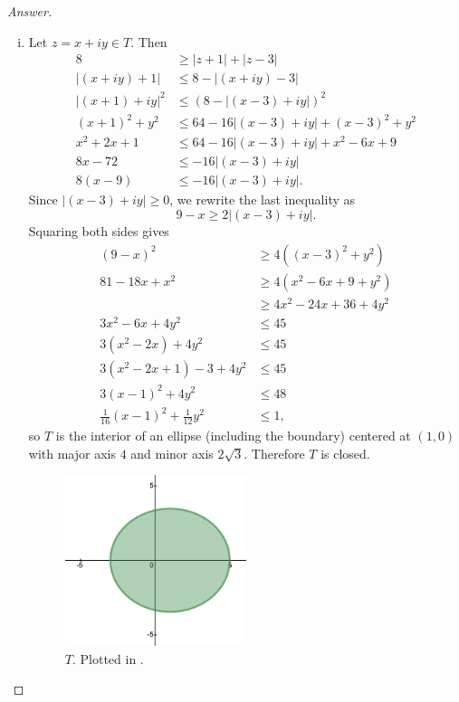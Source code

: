 \documentclass[12pt]{article}
\newcommand\paren[1]{\left( #1 \right)}
\theoremstyle{definition}
\begin{document}
\begin{proof}[Answer]
\begin{enumerate}[i)]
\begin{figure}[H]
            \label{fig:fig4}
        \end{figure}
        \item Let $z = x + iy \in T$. Then
        \begin{align*}
            8 & \geq |z+1| + |z-3| \\
            |(x+iy) + 1| & \leq 8 - |(x+iy) - 3| \\
            |(x+1) + iy|^2 & \leq \paren{ 8 - |(x-3) + iy| }^2 \\
            (x+1)^2 + y^2 & \leq 64 - 16 |(x-3) + iy| + (x-3)^2 + y^2 \\
            x^2 + 2x + 1 & \leq 64 - 16 |(x-3) + iy| + x^2 - 6x + 9 \\
            8x - 72 & \leq -16 |(x-3) + iy| \\
            8(x-9) & \leq -16 |(x-3) + iy|.
        \end{align*}
        Since $|(x-3) + iy| \geq 0$, we rewrite the last inequality as 
        \[
            9 - x \geq 2 |(x-3) + iy|.
        \]
        Squaring both sides gives
        \begin{align*}
            (9-x)^2 & \geq 4 \paren{ (x-3)^2 + y^2 } \\
            81 - 18x + x^2 & \geq 4(x^2 - 6x + 9 + y^2) \\
            & \geq 4x^2 - 24x + 36 + 4y^2 \\
            3x^2 - 6x + 4y^2 & \leq 45 \\
            3(x^2 - 2x)  + 4y^2 & \leq 45 \\
            3(x^2 - 2x + 1) - 3 + 4y^2 & \leq 45 \\
            3(x-1)^2 + 4y^2 & \leq 48 \\
            \frac{1}{16}(x-1)^2 + \frac{1}{12}y^2 & \leq 1,
        \end{align*}
        so $T$ is the interior of an ellipse (including the boundary) centered at $(1,0)$ with major axis $4$ and minor axis $2\sqrt{3}$. Therefore $T$ is closed.
        \begin{figure}[H]
            \centering
            \includegraphics[width = 0.5\textwidth]{5.png}
            \caption{$T$. Plotted in \cite{Desmos}.}
            \label{fig:fig5}
        \end{figure}
    \end{enumerate}
\end{proof}
\end{document}
